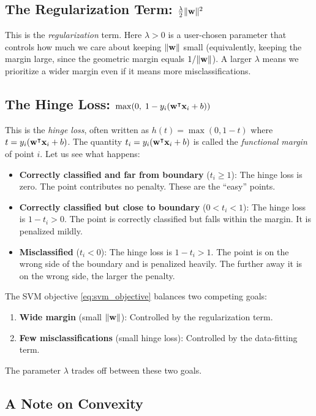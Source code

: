 \documentclass[11pt, letterpaper]{article}
\begin{document}
\subsection{The Regularization Term: $\frac{\lambda}{2}\|\vb{w}\|^2$}

This is the \emph{regularization} term. Here $\lambda > 0$ is a user-chosen parameter that controls how much we care about keeping $\|\vb{w}\|$ small (equivalently, keeping the margin large, since the geometric margin equals $1/\|\vb{w}\|$). A larger $\lambda$ means we prioritize a wider margin even if it means more misclassifications.

\subsection{The Hinge Loss: $\max(0,\; 1 - y_i(\vb{w}^{\intercal} \vb{x}_i + b))$}

This is the \emph{hinge loss}, often written as $h(t) = \max(0, 1 - t)$ where $t = y_i(\vb{w}^{\intercal} \vb{x}_i + b)$. The quantity $t_i = y_i(\vb{w}^{\intercal} \vb{x}_i + b)$ is called the \emph{functional margin} of point $i$. Let us see what happens:
\begin{itemize}[leftmargin=2em]
    \item \textbf{Correctly classified and far from boundary} ($t_i \geq 1$): The hinge loss is zero. The point contributes no penalty. These are the ``easy'' points.
    \item \textbf{Correctly classified but close to boundary} ($0 < t_i < 1$): The hinge loss is $1 - t_i > 0$. The point is correctly classified but falls within the margin. It is penalized mildly.
    \item \textbf{Misclassified} ($t_i < 0$): The hinge loss is $1 - t_i > 1$. The point is on the wrong side of the boundary and is penalized heavily. The further away it is on the wrong side, the larger the penalty.
\end{itemize}
The SVM objective \cref{eq:svm_objective} balances two competing goals:
\begin{enumerate}[leftmargin=2em]
    \item \textbf{Wide margin} (small $\|\vb{w}\|$): Controlled by the regularization term.
    \item \textbf{Few misclassifications} (small hinge loss): Controlled by the data-fitting term.
\end{enumerate}
The parameter $\lambda$ trades off between these two goals.

\subsection{A Note on Convexity}
\end{document}

